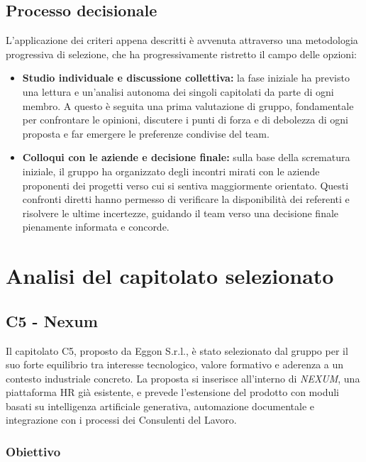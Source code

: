 \documentclass[a4paper,12pt]{article}
\begin{document}
\subsection{Processo decisionale}

L'applicazione dei criteri appena descritti è avvenuta attraverso una metodologia progressiva di selezione, che ha progressivamente ristretto il campo delle opzioni:

\begin{itemize}
    \item \textbf{Studio individuale e discussione collettiva:} la fase iniziale ha previsto una lettura e un'analisi autonoma dei singoli capitolati da parte di ogni membro. A questo è seguita una prima valutazione di gruppo, fondamentale per confrontare le opinioni, discutere i punti di forza e di debolezza di ogni proposta e far emergere le preferenze condivise del team.
    \item \textbf{Colloqui con le aziende e decisione finale:} sulla base della scrematura iniziale, il gruppo ha organizzato degli incontri mirati con le aziende proponenti dei progetti verso cui si sentiva maggiormente orientato. Questi confronti diretti hanno permesso di verificare la disponibilità dei referenti e risolvere le ultime incertezze, guidando il team verso una decisione finale pienamente informata e concorde.
\end{itemize}

\section{Analisi del capitolato selezionato}
\subsection{C5 - Nexum}

Il capitolato C5, proposto da Eggon S.r.l., è stato selezionato dal gruppo per il suo forte equilibrio tra interesse tecnologico, valore formativo e aderenza a un contesto industriale concreto. La proposta si inserisce all'interno di \textit{NEXUM}, una piattaforma HR già esistente, e prevede l'estensione del prodotto con moduli basati su intelligenza artificiale generativa, automazione documentale e integrazione con i processi dei Consulenti del Lavoro.

\subsubsection{Obiettivo}
\end{document}
